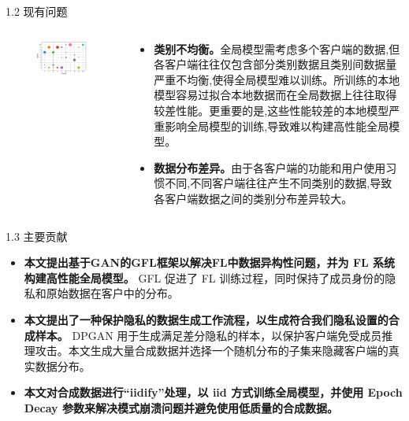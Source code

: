 \documentclass{sintefbeamer}
\theoremstyle{definition}
\begin{document}
\begin{frame}{1.2 现有问题}
\begin{columns}
\begin{column}{0.45\textwidth}
\begin{figure}[ht]
\centering
\includegraphics[width=1\textwidth]{images/img_unbalance}
\end{figure}
\end{column}
\begin{column}{0.65\textwidth}
\begin{itemize}
\item \textbf{类别不均衡。}全局模型需考虑多个客户端的数据,但各客户端往往仅包含部分类别数据且类别间数据量严重不均衡,使得全局模型难以训练。所训练的本地模型容易过拟合本地数据而在全局数据上往往取得较差性能。更重要的是,这些性能较差的本地模型严重影响全局模型的训练,导致难以构建高性能全局模型。
\item \textbf{数据分布差异。}由于各客户端的功能和用户使用习惯不同,不同客户端往往产生不同类别的数据,导致各客户端数据之间的类别分布差异较大。
\end{itemize}
\end{column}
\end{columns}
\end{frame}


\begin{frame}{1.3 主要贡献}
\begin{itemize}
\item \textbf{本文提出基于GAN的GFL框架以解决FL中数据异构性问题，并为 FL 系统构建高性能全局模型。 }GFL 促进了 FL 训练过程，同时保持了成员身份的隐私和原始数据在客户中的分布。
\item \textbf{本文提出了一种保护隐私的数据生成工作流程，以生成符合我们隐私设置的合成样本。} DPGAN 用于生成满足差分隐私的样本，以保护客户端免受成员推理攻击。本文生成大量合成数据并选择一个随机分布的子集来隐藏客户端的真实数据分布。
\item \textbf{本文对合成数据进行“iidify”处理，以 iid 方式训练全局模型，并使用 Epoch Decay 参数来解决模式崩溃问题并避免使用低质量的合成数据。}
\end{itemize}
\end{frame}
\end{document}
